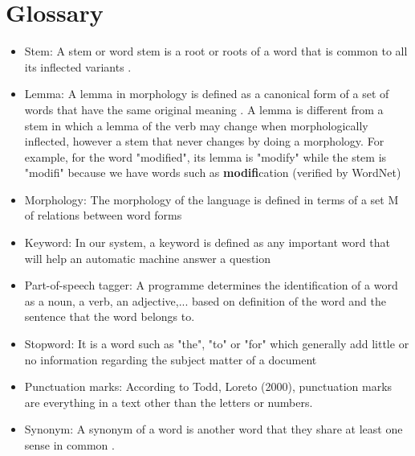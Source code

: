 \newpage




\chapter*{Glossary}   

\small

\begin{itemize}
\item {Stem: A stem or word stem is a root or roots of a word that is common to all its inflected variants \cite{Stem}. }

\item {Lemma: A lemma in morphology is defined as a canonical form of a set of words that have the same original meaning \cite{clement2004mba}. A lemma is different from a stem in which a lemma of the verb may change when morphologically inflected, however a stem that never changes by doing a morphology. For example, for the word "modified", its lemma is "modify" while the stem is "modifi" because we have words such as \textbf{modifi}cation (verified by WordNet\cite{miller1995wld})}

\item {Morphology: The morphology of the language is defined in terms of a set M of relations between word forms \cite{miller1995wld}}

\item {Keyword: In our system, a keyword is defined as any important word that will help an automatic machine answer a question \cite{buscaldi2007ngv}}

\item {Part-of-speech tagger: A programme determines the identification of a word as a noun, a verb, an adjective,... based on definition of the word and the sentence that the word belongs to. \cite{manson1997qpp}}

\item {Stopword: It is a word such as "the", "to" or "for" which generally add little or no information regarding the subject matter of a document \cite{mckechnie2001cap}}

\item {Punctuation marks: According to Todd, Loreto (2000),  punctuation marks are everything in a text other than the letters or numbers.}

\item {Synonym: A synonym of a word is another word that they share at least one sense in common \cite{miller1995wld}. }


\end{itemize}
